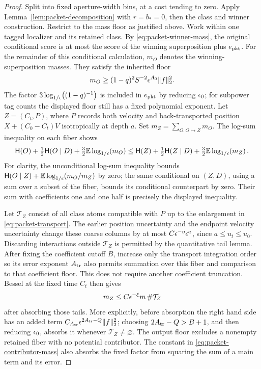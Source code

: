 \begin{proof}
Split into fixed aperture-width bins, at a cost tending to zero.
Apply Lemma~\ref{lem:packet-decomposition} with \(r=b_*=0\), then
the class and winner construction.  Restrict to the mass floor as
justified above.  Work within one tagged localizer and its retained
class.  By \eqref{eq:packet-winner-mass}, the original conditional
score is at most the score of the winning superposition plus
\(e_{\rm pkt}\).  For the remainder of this conditional calculation,
\(m_O\) denotes the winning-superposition masses.  They satisfy
the inherited floor
\[
 m_O\ge (1-q)^2S^{-2}\epsilon^{A_0}\|f\|_2^2.
\]
The factor \(3\log_{1/\epsilon}\!\left((1-q)^{-1}\right)\) is included in
\(e_{\rm pkt}\) by reducing \(\epsilon_0\); for subpower tag counts
the displayed floor still has a fixed polynomial exponent.
Let \(Z=(C_t,P)\), where \(P\) records both velocity and
back-transported position \(X+(C_0-C_t)V\) isotropically at
depth \(a\).  Set \(m_Z=\sum_{O:O\mapsto Z}m_O\).
The log-sum inequality on each fiber shows
\begin{equation}
 \mathsf H(O)+\tfrac12\mathsf H(O\mid D)+\tfrac32\mathbb E\log_{1/\epsilon}\!\left(m_O\right)
 \le \mathsf H(Z)+\tfrac12\mathsf H(Z\mid D)+\tfrac32\mathbb E\log_{1/\epsilon}\!\left(m_Z\right).
 \label{eq:packet-coarsen-mass}
\end{equation}
For clarity, the unconditional log-sum inequality bounds
\(\mathsf H(O\mid Z)+\mathbb E\log_{1/\epsilon}\!\left(m_O/m_Z\right)\) by zero; the
same conditional on \((Z,D)\), using a sum over a subset of the
fiber, bounds its conditional counterpart by zero.  Their sum with
coefficients one and one half is precisely the displayed inequality.

Let \(\mathcal T_Z\) consist of all class atoms compatible with
\(P\) up to the enlargement in \eqref{eq:packet-transport}.
The earlier position uncertainty and the endpoint velocity
uncertainty change these coarse columns by at most
\(C\epsilon^{-\eta}\epsilon^a\), since \(a\le u_t\le u_0\).
Discarding interactions outside \(\mathcal T_Z\) is permitted by
the quantitative tail lemma.  After fixing the coefficient cutoff
\(B\), increase only the transport integration order so its error
exponent \(A_{\rm tr}\) also permits summation over this fiber and
comparison to that coefficient floor.  This does not require
another coefficient truncation.  Bessel at the fixed time \(C_t\)
then gives
\begin{equation}
 m_Z\le C\epsilon^{-\xi}m\,\#\mathcal T_Z
 \label{eq:packet-contributor-mass}
\end{equation}
after absorbing those tails.  More explicitly, before absorption
the right hand side has an added term
\(C_{A_{\rm tr}}\epsilon^{2A_{\rm tr}-Q}\|f\|_2^2\); choosing
\(2A_{\rm tr}-Q>B+1\), and then reducing \(\epsilon_0\), absorbs it whenever
\(\mathcal T_Z\ne\varnothing\).  The output floor excludes a
nonempty retained fiber with no potential contributor.  The
constant in \eqref{eq:packet-contributor-mass} also absorbs the
fixed factor from squaring the sum of a main term and its error.


\end{proof}
